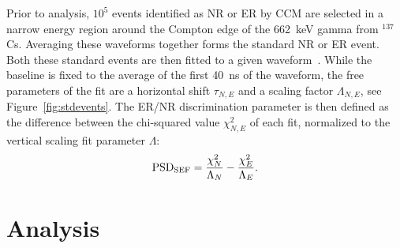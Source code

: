 Prior to analysis, $10^5$ events identified as NR or ER by CCM are selected in a narrow energy region around the Compton edge of the 662~keV gamma from $^{137}$Cs. Averaging these waveforms together forms the standard NR or ER event. Both these standard events are then fitted to a given waveform~\cite{Guerrero:2008,Ambers:2011}. While the baseline is fixed to the average of the first 40~ns of the waveform, the free parameters of the fit are a horizontal shift $\tau_{N,E}$ and a scaling factor $\Lambda_{N,E}$, see Figure~\ref{fig:stdevents}. The ER/NR discrimination parameter is then defined as the difference between the chi-squared value $\chi^2_{N,E}$ of each fit, normalized to the vertical scaling fit parameter $\Lambda$:
\begin{equation}
\mathrm{PSD}_{\mathrm{SEF}} = \frac{\chi^2_N}{\Lambda_N} - \frac{\chi^2_E}{\Lambda_E}.
\end{equation}


\section{Analysis}

